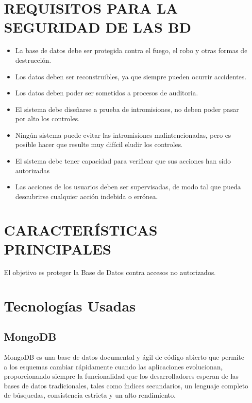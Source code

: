 \documentclass[conference]{IEEEtran}
\begin{document}
\section{REQUISITOS PARA LA SEGURIDAD DE LAS BD}
\begin{itemize}
\item \textbf{} La base de datos debe ser protegida contra el fuego, el robo y otras formas de destrucción.
\\
\item \textbf{} Los datos deben ser reconstruibles, ya que siempre pueden ocurrir accidentes.
\\
\item \textbf{} Los datos deben poder ser sometidos a procesos de auditoria.
\\
\item \textbf{} El sistema debe diseñarse a prueba de intromisiones, no deben poder pasar por alto los controles.
\\
\item \textbf{} Ningún sistema puede evitar las intromisiones malintencionadas, pero es posible hacer que resulte muy difícil eludir los controles.
\\
\item \textbf{} El sistema debe tener capacidad para verificar que sus acciones han sido autorizadas
\\
\item \textbf{} Las acciones de los usuarios deben ser supervisadas, de modo tal que pueda descubrirse cualquier acción indebida o errónea.
\\
\end{itemize}

\section{CARACTERÍSTICAS PRINCIPALES}
El objetivo es proteger la Base de Datos contra
accesos no autorizados.


\section{Tecnolog\'ias Usadas}
\subsection{MongoDB}
MongoDB es una base de datos documental y \'agil de c\'odigo abierto que permite a los esquemas cambiar r\'apidamente cuando las aplicaciones evolucionan, proporcionando siempre la funcionalidad que los desarrolladores esperan de las bases de datos tradicionales, tales como \'indices secundarios, un lenguaje completo de b\'usquedas, consistencia estricta y un alto rendimiento.\cite{mongo}
\end{document}
